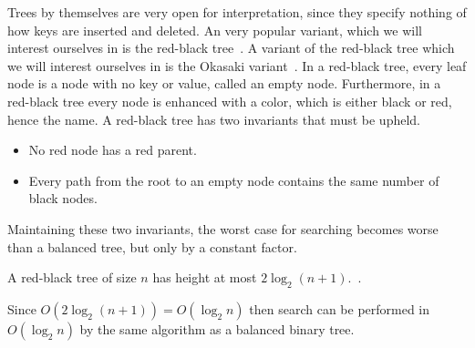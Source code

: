 Trees by themselves are very open for interpretation, since they specify nothing of how keys are inserted and deleted.
An very popular variant, which we will interest ourselves in is the red-black tree~\cite{bayer1972symmetric}.
A variant of the red-black tree which we will interest ourselves in is the Okasaki variant~\cite{okasaki1999red}.
In a red-black tree, every leaf node is a node with no key or value, called an empty node.
Furthermore, in a red-black tree every node is enhanced with a color, which is either black or red, hence the name.
A red-black tree has two invariants that must be upheld.
\begin{itemize}
	\item No red node has a red parent.
	\item Every path from the root to an empty node contains the same number of black nodes.
\end{itemize}
Maintaining these two invariants, the worst case for searching becomes worse than a balanced tree, but only by a constant factor.
\begin{lemma}
	A red-black tree of size $n$ has height at most $2 \log_2 (n + 1)$.~\cite{cormen2009introduction}.
\end{lemma}
Since $O(2 \log_2 (n + 1)) = O(\log_2 n)$ then search can be performed in $O(\log_2 n)$ by the same algorithm as a balanced binary tree.

